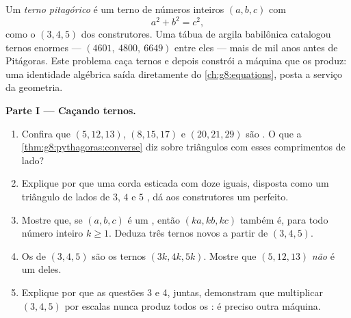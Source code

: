 \begin{problem}[{Problema de fim de semana --- triângulos retângulos de
lados inteiros e a identidade
$(m^2 - n^2)^2 + (2mn)^2 = (m^2 + n^2)^2$ que gera todos eles}]
\label{pb:g8:pythagoras:1}
Um \emph{terno pitagórico} é um terno de
números inteiros $(a, b, c)$ com
\[
a^2 + b^2 = c^2 ,
\]
como o $(3, 4, 5)$ dos construtores. Uma tábua de argila babilônica
catalogou ternos enormes --- $(4601,\ 4800,\ 6649)$ entre eles --- mais
de mil anos antes de Pitágoras. Este problema caça ternos e depois
constrói a máquina que os produz: uma identidade algébrica saída
diretamente do \cref{ch:g8:equations}, posta a serviço da geometria.

\medskip
\noindent\textbf{Parte I --- Caçando ternos.}
\begin{enumerate}
  \item Confira que $(5, 12, 13)$, $(8, 15, 17)$ e $(20, 21, 29)$ são
        . O que a
        \cref{thm:g8:pythagoras:converse} diz sobre triângulos com
        esses comprimentos de lado?
  \item Explique por que uma corda esticada com doze  iguais,
        disposta como um triângulo de lados de $3$, $4$ e $5$
        , dá aos construtores um  perfeito.
  \item Mostre que, se $(a, b, c)$ é um , então
        $(ka, kb, kc)$ também é, para todo número inteiro $k \geq 1$.
        Deduza três ternos novos a partir de $(3, 4, 5)$.
  \item Os  de $(3, 4, 5)$ são os ternos $(3k, 4k, 5k)$.
        Mostre que $(5, 12, 13)$ \emph{não} é um deles.
  \item Explique por que as questões 3 e 4, juntas, demonstram que
        multiplicar $(3, 4, 5)$ por escalas nunca produz todos os
        : é preciso outra máquina.
\end{enumerate}


\end{problem}
